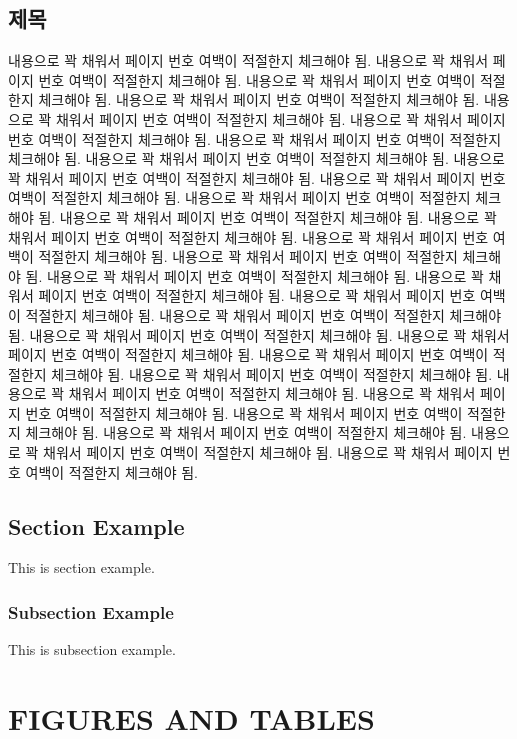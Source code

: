 \documentclass[master,korean]{snuee}
\begin{document}
	\section{제목}
	내용으로 꽉 채워서 페이지 번호 여백이 적절한지 체크해야 됨.
	내용으로 꽉 채워서 페이지 번호 여백이 적절한지 체크해야 됨.
	내용으로 꽉 채워서 페이지 번호 여백이 적절한지 체크해야 됨.
	내용으로 꽉 채워서 페이지 번호 여백이 적절한지 체크해야 됨.
	내용으로 꽉 채워서 페이지 번호 여백이 적절한지 체크해야 됨.
	내용으로 꽉 채워서 페이지 번호 여백이 적절한지 체크해야 됨.
	내용으로 꽉 채워서 페이지 번호 여백이 적절한지 체크해야 됨.
	내용으로 꽉 채워서 페이지 번호 여백이 적절한지 체크해야 됨.
	내용으로 꽉 채워서 페이지 번호 여백이 적절한지 체크해야 됨.
	내용으로 꽉 채워서 페이지 번호 여백이 적절한지 체크해야 됨.
	내용으로 꽉 채워서 페이지 번호 여백이 적절한지 체크해야 됨.
	내용으로 꽉 채워서 페이지 번호 여백이 적절한지 체크해야 됨.
	내용으로 꽉 채워서 페이지 번호 여백이 적절한지 체크해야 됨.
	내용으로 꽉 채워서 페이지 번호 여백이 적절한지 체크해야 됨.
	내용으로 꽉 채워서 페이지 번호 여백이 적절한지 체크해야 됨.
	내용으로 꽉 채워서 페이지 번호 여백이 적절한지 체크해야 됨.
	내용으로 꽉 채워서 페이지 번호 여백이 적절한지 체크해야 됨.
	내용으로 꽉 채워서 페이지 번호 여백이 적절한지 체크해야 됨.
	내용으로 꽉 채워서 페이지 번호 여백이 적절한지 체크해야 됨.
	내용으로 꽉 채워서 페이지 번호 여백이 적절한지 체크해야 됨.
	내용으로 꽉 채워서 페이지 번호 여백이 적절한지 체크해야 됨.
	내용으로 꽉 채워서 페이지 번호 여백이 적절한지 체크해야 됨.
	내용으로 꽉 채워서 페이지 번호 여백이 적절한지 체크해야 됨.
	내용으로 꽉 채워서 페이지 번호 여백이 적절한지 체크해야 됨.
	내용으로 꽉 채워서 페이지 번호 여백이 적절한지 체크해야 됨.
	내용으로 꽉 채워서 페이지 번호 여백이 적절한지 체크해야 됨.
	내용으로 꽉 채워서 페이지 번호 여백이 적절한지 체크해야 됨.
	내용으로 꽉 채워서 페이지 번호 여백이 적절한지 체크해야 됨.
	내용으로 꽉 채워서 페이지 번호 여백이 적절한지 체크해야 됨.

    \section{Section Example}
    This is section example.
    \subsection{Subsection Example}
    This is subsection example.

    \chapter{FIGURES AND TABLES}
\end{document}
